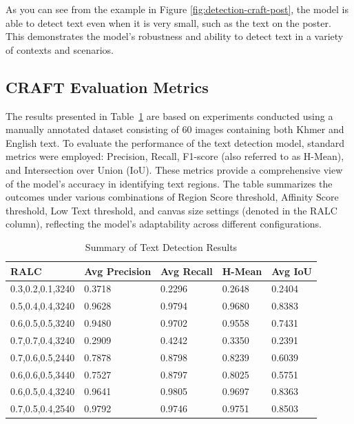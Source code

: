 {As you can see from the example in Figure \ref{fig:detection-craft-post}, 
the model is able to detect text even when it is very small, such as the text on the poster. 
This demonstrates the model's robustness and ability to detect text in a variety of contexts and scenarios.



\subsection{CRAFT Evaluation Metrics}
\label{subsec:craft-evaluation}

The results presented in Table~\ref{tab:craft_experimental_result} are based on experiments 
conducted using a manually annotated dataset consisting of 60 images containing both Khmer and English 
text. To evaluate the performance of the text detection model, standard metrics were employed: 
Precision, Recall, F1-score (also referred to as H-Mean), and Intersection over Union (IoU). 
These metrics provide a comprehensive view of the model’s accuracy in identifying text regions. 
The table summarizes the outcomes under various combinations of Region Score threshold, 
Affinity Score threshold, Low Text threshold, and canvas size settings (denoted in the RALC column), 
reflecting the model's adaptability across different configurations.

\begin{table}[H]
    \centering
    \caption{Summary of Text Detection Results}
    \renewcommand{\arraystretch}{1.5}
    \begin{tabular}{|p{3.5cm}|p{3.0cm}|p{3.0cm}|p{2.0cm}|p{3.0cm}|}
    \hline
    \textbf{RALC} & \textbf{Avg Precision} & \textbf{Avg Recall} & \textbf{H-Mean} & \textbf{Avg IoU} \\
    \hline
    0.3,0.2,0.1,3240 & 0.3718 & 0.2296 & 0.2648 & 0.2404\\
    \hline
    0.5,0.4,0.4,3240 & 0.9628 & 0.9794 & 0.9680 & 0.8383\\
    \hline
    0.6,0.5,0.5,3240 & 0.9480 & 0.9702 & 0.9558 & 0.7431\\
    \hline
    0.7,0.7,0.4,3240 & 0.2909 & 0.4242 & 0.3350 & 0.2391\\
    \hline
    0.7,0.6,0.5,2440 & 0.7878 & 0.8798 & 0.8239 & 0.6039\\
    \hline
    0.6,0.6,0.5,3440 & 0.7527 & 0.8797 & 0.8025 & 0.5751\\
    \hline
    0.6,0.5,0.4,3240 & 0.9641 & 0.9805 & 0.9697 & 0.8363\\
    \hline
    0.7,0.5,0.4,2540 & 0.9792 & 0.9746 & 0.9751 & 0.8503\\
    \hline
    \end{tabular}
    \label{tab:craft_experimental_result}
\end{table}

}
